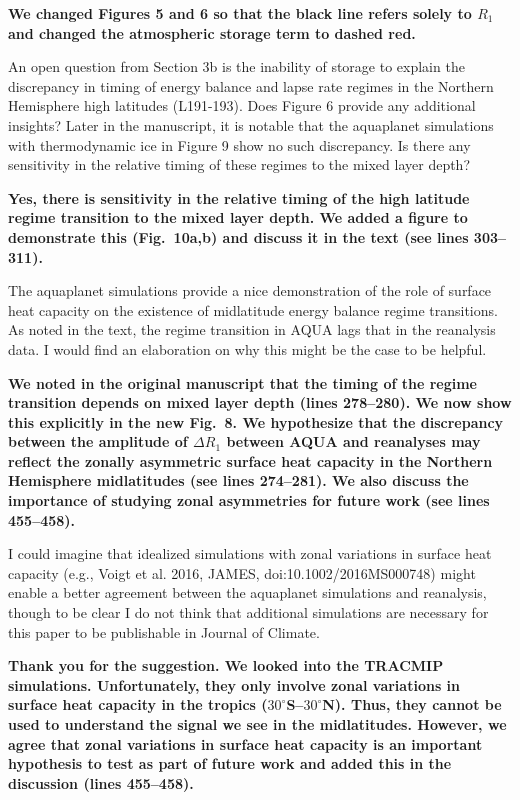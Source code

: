 \documentclass{article}
\begin{document}
\textbf{We changed Figures 5 and 6 so that the black line  refers solely to $R_1$ and changed the atmospheric storage term to dashed red.}

An open question from Section 3b is the inability of storage to explain the discrepancy in timing of energy balance and lapse rate regimes in the Northern Hemisphere high latitudes (L191-193). Does Figure 6 provide any additional insights? Later in the manuscript, it is notable that the aquaplanet simulations with thermodynamic ice in Figure 9 show no such discrepancy. Is there any sensitivity in the relative timing of these regimes to the mixed layer depth?

\textbf{Yes, there is sensitivity in the relative timing of the high latitude regime transition to the mixed layer depth. We added a figure to demonstrate this (Fig.~10a,b) and discuss it in the text (see lines 303--311).}

The aquaplanet simulations provide a nice demonstration of the role of surface heat capacity on the existence of midlatitude energy balance regime transitions. As noted in the text, the regime transition in AQUA lags that in the reanalysis data. I would find an elaboration on why this might be the case to be helpful.

\textbf{We noted in the original manuscript that the timing of the regime transition depends on mixed layer depth (lines 278--280). We now show this explicitly in the new Fig.~8. We hypothesize that the discrepancy between the amplitude of $\Delta R_1$ between AQUA and reanalyses may reflect the zonally asymmetric surface heat capacity in the Northern Hemisphere midlatitudes (see lines 274--281). We also discuss the importance of studying zonal asymmetries for future work (see lines 455--458).}

I could imagine that idealized simulations with zonal variations in surface heat capacity (e.g., Voigt et al. 2016, JAMES, doi:10.1002/2016MS000748) might enable a better agreement between the aquaplanet simulations and reanalysis, though to be clear I do not think that additional simulations are necessary for this paper to be publishable in Journal of Climate.

\textbf{Thank you for the suggestion. We looked into the TRACMIP simulations. Unfortunately, they only involve zonal variations in surface heat capacity in the tropics ($30^\circ$S--$30^\circ$N). Thus, they cannot be used to understand the signal we see in the midlatitudes. However, we agree that zonal variations in surface heat capacity is an important hypothesis to test as part of future work and added this in the discussion (lines 455--458).}
\end{document}
